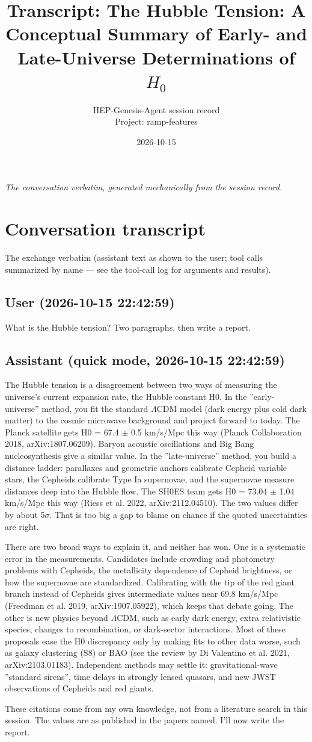 \documentclass[11pt,a4paper]{article}
\title{Transcript: The Hubble Tension: A Conceptual Summary of Early- and Late-Universe Determinations of $H_0$}
\author{HEP-Genesis-Agent session record \\ \small Project: ramp-features}
\date{2026-10-15}
\begin{document}
\maketitle
\noindent\textit{\small The conversation verbatim, generated mechanically from the session record.}
\vspace{1em}



\appendix
\section{Conversation transcript}
\label{app:transcript}
The exchange verbatim (assistant text as shown to the user; tool calls summarized by name --- see the tool-call log for arguments and results).
\subsection*{User \small(2026-10-15 22:42:59)}
What is the Hubble tension? Two paragraphs, then write a report.

\subsection*{Assistant \small(quick mode, 2026-10-15 22:42:59)}
The Hubble tension is a disagreement between two ways of measuring the universe's current expansion rate, the Hubble constant H0. In the ''early-universe'' method, you fit the standard $\Lambda$CDM model (dark energy plus cold dark matter) to the cosmic microwave background and project forward to today. The Planck satellite gets H0 = 67.4 $\pm$ 0.5 km/s/Mpc this way (Planck Collaboration 2018, arXiv:1807.06209). Baryon acoustic oscillations and Big Bang nucleosynthesis give a similar value. In the ''late-universe'' method, you build a distance ladder: parallaxes and geometric anchors calibrate Cepheid variable stars, the Cepheids calibrate Type Ia supernovae, and the supernovae measure distances deep into the Hubble flow. The SH0ES team gets H0 = 73.04 $\pm$ 1.04 km/s/Mpc this way (Riess et al. 2022, arXiv:2112.04510). The two values differ by about 5$\sigma$. That is too big a gap to blame on chance if the quoted uncertainties are right.

There are two broad ways to explain it, and neither has won. One is a systematic error in the measurements. Candidates include crowding and photometry problems with Cepheids, the metallicity dependence of Cepheid brightness, or how the supernovae are standardized. Calibrating with the tip of the red giant branch instead of Cepheids gives intermediate values near 69.8 km/s/Mpc (Freedman et al. 2019, arXiv:1907.05922), which keeps that debate going. The other is new physics beyond $\Lambda$CDM, such as early dark energy, extra relativistic species, changes to recombination, or dark-sector interactions. Most of these proposals ease the H0 discrepancy only by making fits to other data worse, such as galaxy clustering (S8) or BAO (see the review by Di Valentino et al. 2021, arXiv:2103.01183). Independent methods may settle it: gravitational-wave ''standard sirens'', time delays in strongly lensed quasars, and new JWST observations of Cepheids and red giants.

These citations come from my own knowledge, not from a literature search in this session. The values are as published in the papers named. I'll now write the report.
\end{document}
